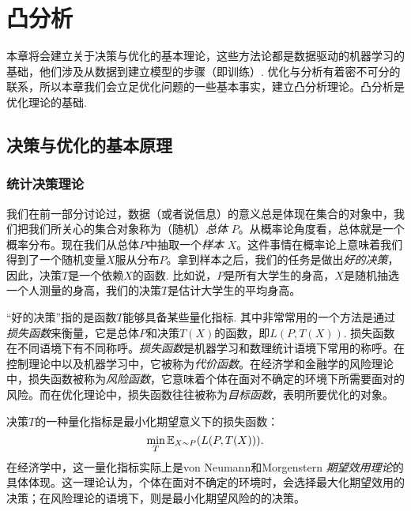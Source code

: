 \chapter{凸分析}\label{chap:convex-analysis}

本章将会建立关于决策与优化的基本理论，这些方法论都是数据驱动的机器学习的基础，他们涉及从数据到建立模型的步骤（即训练）. 优化与分析有着密不可分的联系，所以本章我们会立足优化问题的一些基本事实，建立凸分析理论。凸分析是优化理论的基础.

\section{决策与优化的基本原理}
\subsection{统计决策理论}

我们在前一部分讨论过，数据（或者说信息）的意义总是体现在集合的对象中，我们把我们所关心的集合对象称为（随机）\emph{总体} $P$。从概率论角度看，总体就是一个概率分布。现在我们从总体$P$中抽取一个\emph{样本} $X$。这件事情在概率论上意味着我们得到了一个随机变量$X$服从分布$P$。拿到样本之后，我们的任务是做出\emph{好的决策}，因此，决策$T$是一个依赖$X$的函数. 比如说，$P$是所有大学生的身高，$X$是随机抽选一个人测量的身高，我们的决策$T$是估计大学生的平均身高。

“好的决策”指的是函数$T$能够具备某些量化指标. 其中非常常用的一个方法是通过\emph{损失函数}来衡量，它是总体$P$和决策$T(X)$的函数，即$L(P,T(X))$. 损失函数在不同语境下有不同称呼。\emph{损失函数}是机器学习和数理统计语境下常用的称呼。在控制理论中以及机器学习中，它被称为\emph{代价函数}。在经济学和金融学的风险理论中，损失函数被称为\emph{风险函数}，它意味着个体在面对不确定的环境下所需要面对的风险。而在优化理论中，损失函数往往被称为\emph{目标函数}，表明所要优化的对象。

决策$T$的一种量化指标是最小化期望意义下的损失函数：
    \[\min_{T}\mathbb{E}_{X\sim P}(L(P,T(X))).\]
在经济学中，这一量化指标实际上是von Neumann和Morgenstern \emph{期望效用理论}的具体体现。这一理论认为，个体在面对不确定的环境时，会选择最大化期望效用的决策；在风险理论的语境下，则是最小化期望风险的的决策。

